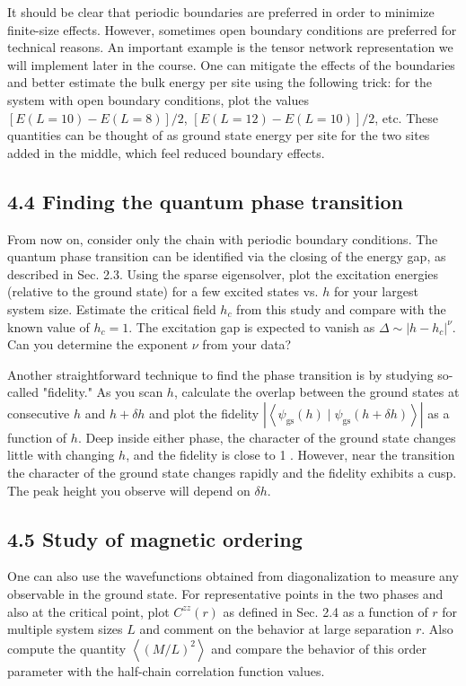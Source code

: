 \documentclass[10pt]{article}
\begin{document}
It should be clear that periodic boundaries are preferred in order to minimize finite-size effects. However, sometimes open boundary conditions are preferred for technical reasons. An important example is the tensor network representation we will implement later in the course. One can mitigate the effects of the boundaries and better estimate the bulk energy per site using the following trick: for the system with open boundary conditions, plot the values $[E(L=10)-E(L=8)] / 2$, $[E(L=12)-E(L=10)] / 2$, etc. These quantities can be thought of as ground state energy per site for the two sites added in the middle, which feel reduced boundary effects.

\subsection*{4.4 Finding the quantum phase transition}
From now on, consider only the chain with periodic boundary conditions. The quantum phase transition can be identified via the closing of the energy gap, as described in Sec. 2.3. Using the sparse eigensolver, plot the excitation energies (relative to the ground state) for a few excited states vs. $h$ for your largest system size. Estimate the critical field $h_{c}$ from this study and compare with the known value of $h_{c}=1$. The excitation gap is expected to vanish as $\Delta \sim\left|h-h_{c}\right|^{\nu}$. Can you determine the exponent $\nu$ from your data?

Another straightforward technique to find the phase transition is by studying so-called "fidelity." As you scan $h$, calculate the overlap between the ground states at consecutive $h$ and $h+\delta h$ and plot the fidelity $\left|\left\langle\psi_{\mathrm{gs}}(h) \mid \psi_{\mathrm{gs}}(h+\delta h)\right\rangle\right|$ as a function of $h$. Deep inside either phase, the character of the ground state changes little with changing $h$, and the fidelity is close to 1 . However, near the transition the character of the ground state changes rapidly and the fidelity exhibits a cusp. The peak height you observe will depend on $\delta h$.

\subsection*{4.5 Study of magnetic ordering}
One can also use the wavefunctions obtained from diagonalization to measure any observable in the ground state. For representative points in the two phases and also at the critical point, plot $C^{z z}(r)$ as defined in Sec. 2.4 as a function of $r$ for multiple system sizes $L$ and comment on the behavior at large separation $r$. Also compute the quantity $\left\langle(M / L)^{2}\right\rangle$ and compare the behavior of this order parameter with the half-chain correlation function values.
\end{document}

